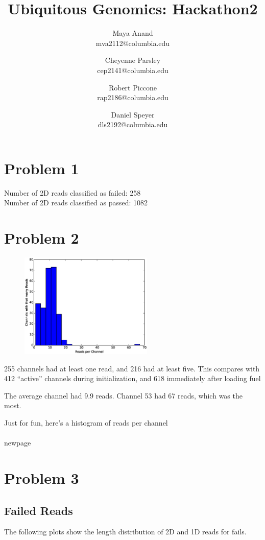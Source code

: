 \documentclass[11pt]{article}
\title{Ubiquitous Genomics: Hackathon2}
\author{
  Maya Anand\\ mva2112@columbia.edu \and
  Cheyenne Parsley\\ cep2141@columbia.edu \and
  Robert Piccone\\ rap2186@columbia.edu \and
  Daniel Speyer\\ dls2192@columbia.edu}
\begin{document}
\maketitle
\section*{Problem 1}
Number of 2D reads classified as failed: 258\\
Number of 2D reads classified as passed: 1082\\
\section*{Problem 2}
\begin{figure}
  \vspace{-20pt}
  \includegraphics[width=2.5in]{part2hist}
  \vspace{-20pt}
\end{figure}
255 channels had at least one read, and 216 had at least five.  
This compares with 412 ``active'' channels during initialization, and 618 immediately after loading fuel

The average channel had 9.9 reads. 
Channel 53 had 67 reads, which was the most.

Just for fun, here's a histogram of reads per channel\\
\\newpage
\section*{Problem 3}
\subsection*{Failed Reads}

        The following plots show the length distribution of 2D and 1D reads for fails.
       
\end{document}
